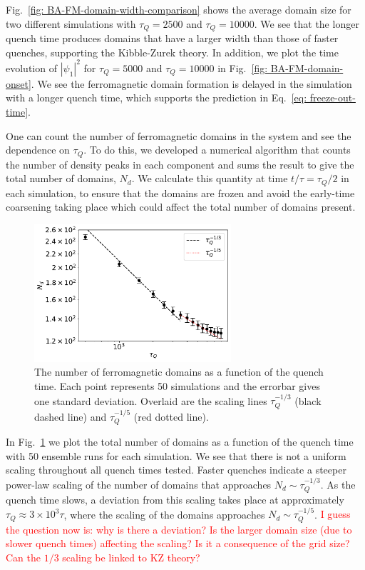 Fig.~\ref{fig: BA-FM-domain-width-comparison} shows the average domain size
for two different simulations with $\tau_Q=2500$ and $\tau_Q=10000$.
We see that the longer quench time produces domains that have a
larger width than those of faster quenches, supporting the Kibble-Zurek theory.
In addition, we plot the time evolution of $|\psi_1|^2$ for $\tau_Q=5000$ and
$\tau_Q=10000$ in Fig.~\ref{fig: BA-FM-domain-onset}.
We see the ferromagnetic domain formation is delayed in the simulation
with a longer quench time, which supports the prediction in
Eq.~\eqref{eq: freeze-out-time}.

One can count the number of ferromagnetic domains in the system and see the
dependence on $\tau_Q$.
To do this, we developed a numerical algorithm that counts the number of
density peaks in each component and sums the result to give the total number of
domains, $N_d$.
We calculate this quantity at time $t/\tau=\tau_Q/2$ in each simulation, to
ensure that the domains are frozen and avoid the early-time coarsening
taking place which could affect the total number of domains present.
\begin{figure}
    \centering
    \includegraphics[width=0.65\textwidth]{gfx/ch-spin1/FM_domains_scaling.pdf}
    \caption{The number of ferromagnetic domains as a function of the
    quench time. Each point represents 50 simulations and the
    errorbar gives one standard deviation. Overlaid are the scaling lines
    $\tau_Q^{-1/3}$ (black dashed line) and $\tau_Q^{-1/5}$ (red dotted line).}
    \label{fig: FM-domains-scaling}
\end{figure}
In Fig.~\ref{fig: FM-domains-scaling} we plot the total number of domains
as a function of the quench time with 50 ensemble runs for each simulation.
We see that there is not a uniform scaling throughout all quench times tested.
Faster quenches indicate a steeper power-law scaling of the number of domains
that approaches $N_d\sim\tau_Q^{-1/3}$.
As the quench time slows, a deviation from this scaling takes place at
approximately $\tau_Q\approx 3\times10^3\tau$, where the scaling of the domains
approaches $N_d\sim\tau_Q^{-1/5}$.
\textcolor{red}{I guess the question now is: why is there a deviation?
Is the larger domain size (due to slower quench times) affecting the scaling?
Is it a consequence of the grid size? Can the $1/3$ scaling be linked to KZ
theory?}

